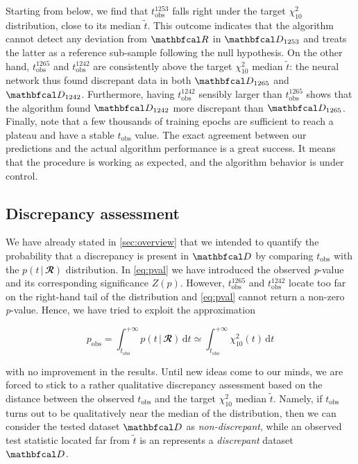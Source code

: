 Starting from below, we find that $t_{\text{obs}}^{1253}$ falls right under the target $\chi^2_{10}$ distribution, close
to its median $\tilde{t}$. This outcome indicates that the algorithm cannot detect any deviation from $\R$ in
$\D_{1253}$ and treats the latter as a reference sub-sample following the null hypothesis. On the other hand,
$t_{\text{obs}}^{1265}$ and $t_{\text{obs}}^{1242}$ are consistently above the target $\chi^2_{10}$ median $\tilde{t}$:
the neural network thus found discrepant data in both $\D_{1265}$ and $\D_{1242}$. Furthermore, having
$t_{\text{obs}}^{1242}$ sensibly larger than $t_{\text{obs}}^{1265}$ shows that the algorithm found $\D_{1242}$ more
discrepant than $\D_{1265}$. Finally, note that a few thousands of training epochs are sufficient to reach a plateau and
have a stable $t_{\text{obs}}$ value. The exact agreement between our predictions and the actual algorithm performance
is a great success. It means that the procedure is working as expected, and the algorithm behavior is under control. 

\subsection{Discrepancy assessment}\label{sec:disc_ass}

We have already stated in \autoref{sec:overview} that we intended to quantify the probability that a discrepancy is
present in $\D$ by comparing $t_{\text{obs}}$ with the $p(t\,|\,\mathbfcal{R})$ distribution. In \autoref{eq:pval} we
have introduced the observed \textit{p}-value and its corresponding significance $Z(p)$. However,
$t_{\text{obs}}^{1265}$ and $t_{\text{obs}}^{1242}$ locate too far on the right-hand tail of the distribution and
\autoref{eq:pval} cannot return a non-zero \textit{p}-value. Hence, we have tried to exploit the approximation 

\begin{equation}\label{eq:pval_approx}
    p_{\text{obs}} =
    \int_{t_{\text{obs}}}^{+\infty}p(t\,|\,\mathbfcal{R})\,\text{d}t
    \simeq
    \int_{t_{\text{obs}}}^{+\infty}\chi^2_{10}(t)\,\text{d}t
\end{equation}

with no improvement in the results. Until new ideas come to our minds, we are forced to stick to a rather qualitative
discrepancy assessment based on the distance between the observed $t_{\text{obs}}$ and the target $\chi^2_{10}$ median
$\tilde{t}$. Namely, if $t_{\text{obs}}$ turns out to be qualitatively near the median of the distribution, then we can
consider the tested dataset $\D$ as \textit{non-discrepant}, while an observed test statistic located far from
$\tilde{t}$ is an represents a \textit{discrepant} dataset $\D$.



